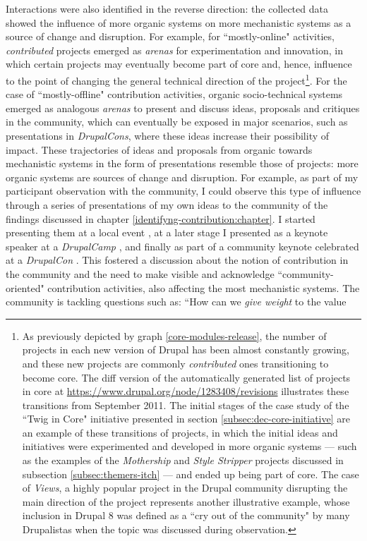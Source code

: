Interactions were also identified in the reverse direction: the collected data showed the influence of more organic systems on more mechanistic systems as a source of change and disruption. For example, for ``mostly-online" activities, \textit{contributed} projects emerged as \textit{arenas} for experimentation and innovation, in which certain projects may eventually become part of core and, hence, influence to the point of changing the general technical direction of the project\footnote{As previously depicted by graph \ref{core-modules-release}, the number of projects in each new version of Drupal has been almost constantly growing, and these new projects are commonly \textit{contributed} ones transitioning to become core. The diff version of the automatically generated list of projects in core at \url{https://www.drupal.org/node/1283408/revisions} illustrates these transitions from September 2011. The initial stages of the case study of the ``Twig in Core" initiative presented in section \ref{subsec:dec-core-initiative} are an example of these transitions of projects, in which the initial ideas and initiatives were experimented and developed in more organic systems --- such as the examples of the \textit{Mothership} and \textit{Style Stripper} projects discussed in subsection \ref{subsec:themers-itch} --- and ended up being part of core. The case of \textit{Views}, a highly popular project in the Drupal community disrupting the main direction of the project represents another illustrative example, whose inclusion in Drupal 8 was defined as a ``cry out of the community" by many Drupalistas when the topic was discussed during observation.}. For the case of ``mostly-offline" contribution activities, organic socio-technical systems emerged as analogous \textit{arenas} to present and discuss ideas, proposals and critiques in the community, which can eventually be exposed in major scenarios, such as presentations in \textit{DrupalCons}, where these ideas increase their possibility of impact. These trajectories of ideas and proposals from organic towards mechanistic systems in the form of presentations resemble those of projects: more organic systems are sources of change and disruption. For example, as part of my participant observation with the community, I could observe this type of influence through a series of presentations of my own ideas to the community of the findings discussed in chapter \ref{identifyng-contribution:chapter}. I started presenting them at a local event \parencite{talk-silver-show-tell:Online}, at a later stage I presented as a keynote speaker at a \textit{DrupalCamp} \parencite{talk-silver-dcnorth:Online}, and finally as part of a community keynote celebrated at a \textit{DrupalCon} \parencite{talk-silver-dconbcn:Online}. This fostered a discussion \parencite{impact-contrib01:Online, impact-contrib02:Online, impact-contrib03:Online, impact-contrib04:Online, impact-contrib05:Online, impact-contrib06:Online, impact-contrib07:Online, impact-contrib08:Online, impact-contrib10:Online} about the notion of contribution in the community and the need to make visible and acknowledge ``community-oriented" contribution activities, also affecting the most mechanistic systems. The community is tackling questions such as: ``How can we \textit{give weight} to the value 